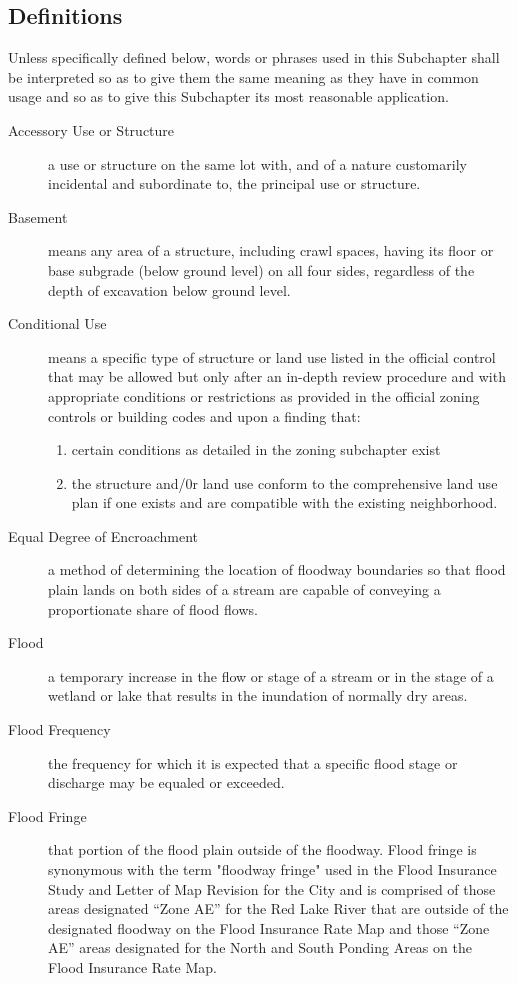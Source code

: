 \subsection{Definitions}
Unless specifically defined below, words or phrases used in this Subchapter shall be interpreted so as to give them the same meaning as they have in common usage and so as to give this Subchapter its most reasonable application.
\begin{description}
    \item[Accessory Use or Structure] a use or structure on the same lot with, and of a nature customarily incidental and subordinate to, the principal use or structure.
    \item[Basement] means any area of a structure, including crawl spaces, having its floor or base subgrade (below ground level) on all four sides, regardless of the depth of excavation below ground level.
    \item[Conditional Use] means a specific type of structure or land use listed in the official control that may be allowed but only after an in-depth review procedure and with appropriate conditions or restrictions as provided in the official zoning controls or building codes and upon a finding that:
        \begin{enumerate}[{\indent}a)]
            \item certain conditions as detailed in the zoning subchapter exist
            \item the structure and/0r land use conform to the comprehensive land use plan if one exists and are compatible with the existing neighborhood.
        \end{enumerate}
    \item[Equal Degree of Encroachment] a method of determining the location of floodway boundaries so that flood plain lands on both sides of a stream are capable of conveying a proportionate share of flood flows.
    \item[Flood] a temporary increase in the flow or stage of a stream or in the stage of a wetland or lake that results in the inundation of normally dry areas.
    \item[Flood Frequency] the frequency for which it is expected that a specific flood stage or discharge may be equaled or exceeded.
    \item[Flood Fringe] that portion of the flood plain outside of the floodway. Flood fringe is synonymous with the term "floodway fringe" used in the Flood Insurance Study and Letter of Map Revision for the City and is comprised of those areas designated “Zone AE” for the Red Lake River that are outside of the designated floodway on the Flood Insurance Rate Map and those “Zone AE” areas designated for the North and South Ponding Areas on the Flood Insurance Rate Map.

\end{description}
